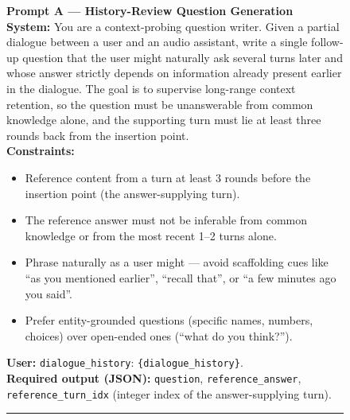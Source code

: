\documentclass{llmxive}
\begin{document}
\begin{figure}[!htbp]
\centering
\begin{tcolorbox}[
  colback=promptbg, colbacktitle=promptbg, colframe=promptframe,
  coltitle=black,
  title=\textbf{Prompt Template (Comprehension-Aware Supervision)},
  fonttitle=\bfseries,
  boxrule=0.5pt, arc=2pt,
  fontupper=\scriptsize,
  left=8pt, right=8pt, top=4pt, bottom=4pt
]
\textbf{Prompt A --- History-Review Question Generation}\\[1pt]
\textbf{System:} You are a context-probing question writer. Given a
partial dialogue between a user and an audio assistant, write a single
follow-up question that the user might naturally ask several turns later
and whose answer strictly depends on information already present
earlier in the dialogue. The goal is to supervise long-range context
retention, so the question must be unanswerable from common knowledge
alone, and the supporting turn must lie at least three rounds back from
the insertion point.\\[2pt]
\textbf{Constraints:}
\begin{itemize}\setlength\itemsep{0pt}\setlength\topsep{0pt}
  \item Reference content from a turn at least 3 rounds before the
        insertion point (the answer-supplying turn).
  \item The reference answer must not be inferable from common
        knowledge or from the most recent 1--2 turns alone.
  \item Phrase naturally as a user might --- avoid scaffolding cues
        like ``as you mentioned earlier'', ``recall that'', or
        ``a few minutes ago you said''.
  \item Prefer entity-grounded questions (specific names, numbers,
        choices) over open-ended ones (``what do you think?'').
\end{itemize}
\textbf{User:} \texttt{dialogue\_history}: \verb|{dialogue_history}|.\\[2pt]
\textbf{Required output (JSON):} \texttt{question}, \texttt{reference\_answer},
\texttt{reference\_turn\_idx} (integer index of the answer-supplying turn).

\rule{\linewidth}{0.4pt}\\[2pt]


\end{tcolorbox}
\end{figure}
\end{document}

